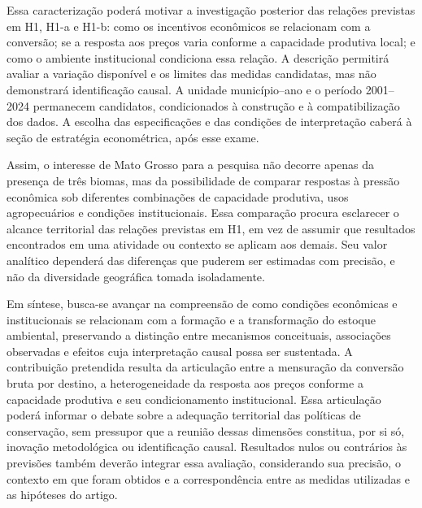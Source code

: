 Essa caracterização poderá motivar a investigação posterior das relações previstas em H1, H1-a e H1-b: como os incentivos econômicos se relacionam com a conversão; se a resposta aos preços varia conforme a capacidade produtiva local; e como o ambiente institucional condiciona essa relação. A descrição permitirá avaliar a variação disponível e os limites das medidas candidatas, mas não demonstrará identificação causal. A unidade município--ano e o período 2001--2024 permanecem candidatos, condicionados à construção e à compatibilização dos dados. A escolha das especificações e das condições de interpretação caberá à seção de estratégia econométrica, após esse exame.

Assim, o interesse de Mato Grosso para a pesquisa não decorre apenas da presença de três biomas, mas da possibilidade de comparar respostas à pressão econômica sob diferentes combinações de capacidade produtiva, usos agropecuários e condições institucionais. Essa comparação procura esclarecer o alcance territorial das relações previstas em H1, em vez de assumir que resultados encontrados em uma atividade ou contexto se aplicam aos demais. Seu valor analítico dependerá das diferenças que puderem ser estimadas com precisão, e não da diversidade geográfica tomada isoladamente.

Em síntese, busca-se avançar na compreensão de como condições econômicas e institucionais se relacionam com a formação e a transformação do estoque ambiental, preservando a distinção entre mecanismos conceituais, associações observadas e efeitos cuja interpretação causal possa ser sustentada. A contribuição pretendida resulta da articulação entre a mensuração da conversão bruta por destino, a heterogeneidade da resposta aos preços conforme a capacidade produtiva e seu condicionamento institucional. Essa articulação poderá informar o debate sobre a adequação territorial das políticas de conservação, sem pressupor que a reunião dessas dimensões constitua, por si só, inovação metodológica ou identificação causal. Resultados nulos ou contrários às previsões também deverão integrar essa avaliação, considerando sua precisão, o contexto em que foram obtidos e a correspondência entre as medidas utilizadas e as hipóteses do artigo.
